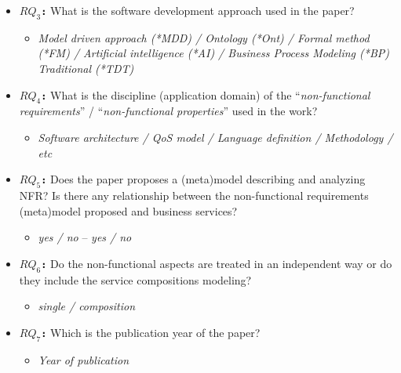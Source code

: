 \begin{itemize}
  \item \textbf{\texttt{$RQ_3$:}} What is the software
  development approach used in the paper?
	\begin{itemize}
	  \item \textit{Model driven approach (*MDD) / Ontology (*Ont) / Formal method
	  (*FM) / Artificial intelligence (*AI) / Business Process Modeling (*BP)
	  Traditional (*TDT)}
	\end{itemize} 
  \item \textbf{\texttt{$RQ_4$:}} What is the discipline (application domain)
  of the ``\textit{non-functional requirements}'' / ``\textit{non-functional
  properties}'' used in the work?
  \begin{itemize}
	  \item \textit{Software architecture / QoS model / Language definition /
	  Methodology / etc}
	\end{itemize}	
  \item \textbf{\texttt{$RQ_5$:}} Does the paper proposes a (meta)model
  describing and analyzing NFR? Is there any relationship between
  the non-functional requirements (meta)model proposed and business services? 
\begin{itemize}
	  \item \textit{yes / no} -- \textit{yes / no}
	\end{itemize}  
  \item \textbf{\texttt{$RQ_6$:}} Do the non-functional aspects are treated in
  an independent way or do they include the service compositions modeling?
\begin{itemize}
	  \item \textit{single / composition}
	\end{itemize}
\item \textbf{\texttt{$RQ_7$:}} Which is the publication year of the paper?
	\begin{itemize}
	  \item \textit{Year of publication}
	\end{itemize}	   
    
\end{itemize}
 
